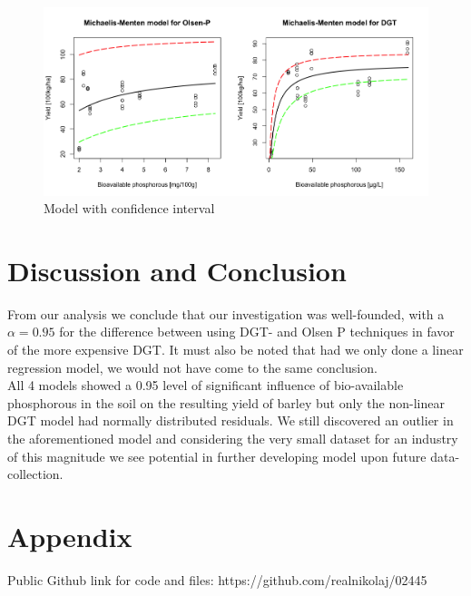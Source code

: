\documentclass{article}
\begin{document}
\begin{figure}[H]
	\includegraphics[width=\linewidth]{modelsEnv.png}
	\caption{Model with confidence interval}
	\label{fig:modelCI}
\end{figure}



\section{Discussion and Conclusion}

From our analysis we conclude that our investigation was well-founded, with a $\alpha = 0.95$ for the difference between using DGT- and Olsen P techniques in favor of the more expensive DGT. It  must also be noted that had we only done a linear regression model, we would not have come to the same conclusion. \\ All 4 models showed a 0.95 level of significant influence of bio-available phosphorous in the soil on the resulting yield of barley but only the non-linear DGT model had normally distributed residuals. 
We still discovered an outlier in the aforementioned model and considering the very small dataset for an industry of this magnitude we see potential in further developing model upon future data-collection.


\section{Appendix}
Public Github link for code and files: https://github.com/realnikolaj/02445
\end{document}

